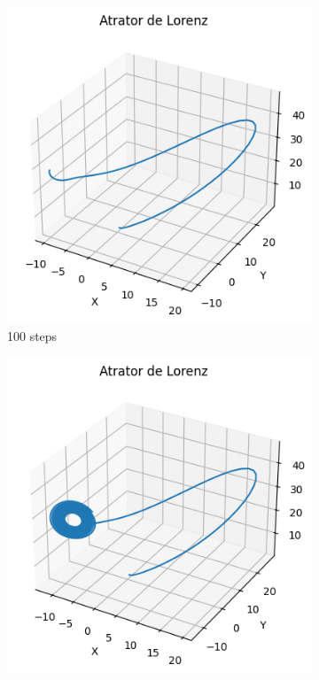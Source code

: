 \documentclass[12pt, a4paper]{article}
\begin{document}
	\begin{figure}[H]
		\centering
		\begin{subfigure}{0.32\textwidth}
			\includegraphics[width=\linewidth]{img/attrator100.png}
			\caption{100 steps}
			\label{fig:lorenz100}
		\end{subfigure}
		\hfill
		\begin{subfigure}{0.32\textwidth}
			\includegraphics[width=\linewidth]{img/attrator1000.png}

\end{subfigure}
\end{figure}
\end{document}
